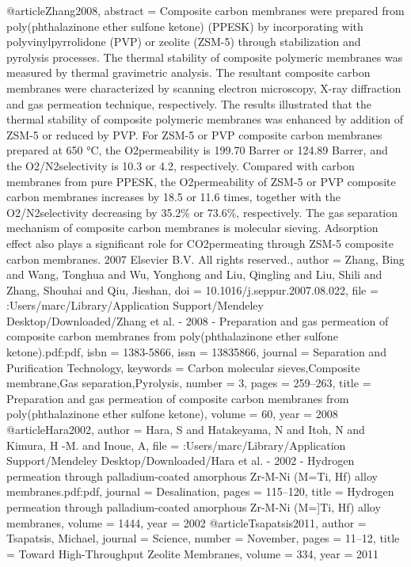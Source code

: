 @article{Zhang2008,
abstract = {Composite carbon membranes were prepared from poly(phthalazinone ether sulfone ketone) (PPESK) by incorporating with polyvinylpyrrolidone (PVP) or zeolite (ZSM-5) through stabilization and pyrolysis processes. The thermal stability of composite polymeric membranes was measured by thermal gravimetric analysis. The resultant composite carbon membranes were characterized by scanning electron microscopy, X-ray diffraction and gas permeation technique, respectively. The results illustrated that the thermal stability of composite polymeric membranes was enhanced by addition of ZSM-5 or reduced by PVP. For ZSM-5 or PVP composite carbon membranes prepared at 650 °C, the O2permeability is 199.70 Barrer or 124.89 Barrer, and the O2/N2selectivity is 10.3 or 4.2, respectively. Compared with carbon membranes from pure PPESK, the O2permeability of ZSM-5 or PVP composite carbon membranes increases by 18.5 or 11.6 times, together with the O2/N2selectivity decreasing by 35.2{\%} or 73.6{\%}, respectively. The gas separation mechanism of composite carbon membranes is molecular sieving. Adsorption effect also plays a significant role for CO2permeating through ZSM-5 composite carbon membranes. {\textcopyright} 2007 Elsevier B.V. All rights reserved.},
author = {Zhang, Bing and Wang, Tonghua and Wu, Yonghong and Liu, Qingling and Liu, Shili and Zhang, Shouhai and Qiu, Jieshan},
doi = {10.1016/j.seppur.2007.08.022},
file = {:Users/marc/Library/Application Support/Mendeley Desktop/Downloaded/Zhang et al. - 2008 - Preparation and gas permeation of composite carbon membranes from poly(phthalazinone ether sulfone ketone).pdf:pdf},
isbn = {1383-5866},
issn = {13835866},
journal = {Separation and Purification Technology},
keywords = {Carbon molecular sieves,Composite membrane,Gas separation,Pyrolysis},
number = {3},
pages = {259--263},
title = {{Preparation and gas permeation of composite carbon membranes from poly(phthalazinone ether sulfone ketone)}},
volume = {60},
year = {2008}
}
@article{Hara2002,
author = {Hara, S and Hatakeyama, N and Itoh, N and Kimura, H -M. and Inoue, A},
file = {:Users/marc/Library/Application Support/Mendeley Desktop/Downloaded/Hara et al. - 2002 - Hydrogen permeation through palladium-coated amorphous Zr-M-Ni (M=Ti, Hf) alloy membranes.pdf:pdf},
journal = {Desalination},
pages = {115--120},
title = {{Hydrogen permeation through palladium-coated amorphous Zr-M-Ni (M=]Ti, Hf) alloy membranes}},
volume = {1444},
year = {2002}
}
@article{Tsapatsis2011,
author = {Tsapatsis, Michael},
journal = {Science},
number = {November},
pages = {11--12},
title = {{Toward High-Throughput Zeolite Membranes}},
volume = {334},
year = {2011}
}
